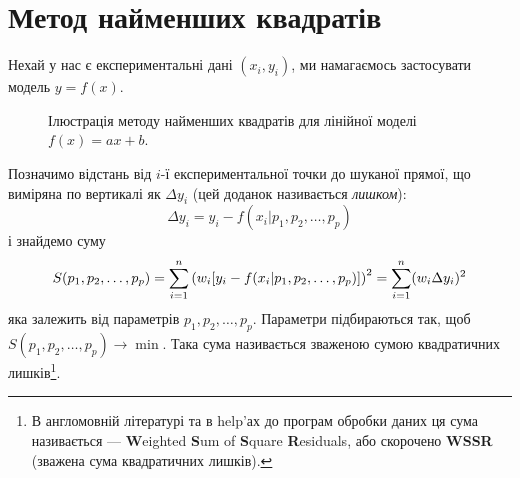 \documentclass{LabBook}
\begin{document}
\section{Метод найменших квадратів}\label{sec:chi}


Нехай у нас є експериментальні дані $(x_i, y_i)$, ми намагаємось застосувати модель  $y = f(x)$.

\begin{figure}[h!]\centering
	\caption{Ілюстрація методу найменших квадратів для лінійної моделі $f(x) = a x + b $.}
\end{figure}

Позначимо відстань від $i$-ї експериментальної точки до шуканої прямої, що виміряна по вертикалі як $\Delta y_i$ (цей доданок називається \emph{лишком}):
\begin{equation*}\label{eq:SR}
	\Delta y_i = y_i - f(x_i| p_1, p_2, \ldots, p_p)
\end{equation*}
і знайдемо суму
\begin{equation}\label{eq:lsmS}
	S(p_1, p_2, \ldots, p_p) = \sum\limits_{i = 1}^n  \left( w_i [y_i - f(x_i| p_1, p_2, \ldots, p_p)] \right)^2 = \sum\limits_{i = 1}^n (w_i\Delta y_i)^2
\end{equation}
яка залежить від параметрів $p_1, p_2, \ldots, p_p$. Параметри підбираються так, щоб $S(p_1, p_2, \ldots, p_p) \to \min$. Така сума називається зваженою сумою квадратичних лишків\footnote{В англомовній літературі та в help'ах до програм обробки даних ця сума називається --- \textbf{W}eighted \textbf{S}um of \textbf{S}quare \textbf{R}esiduals, або скорочено \textbf{WSSR} (зважена сума квадратичних лишків).}.
\end{document}
